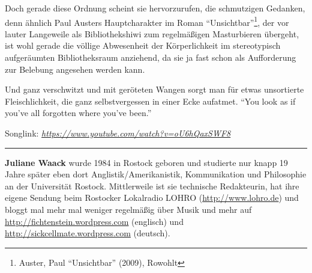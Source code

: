 \documentclass[a4paper,
fontsize=11pt,
oneside,
numbers=noperiodatend,
parskip=half-,
bibliography=totoc,
final
]{scrartcl}
\begin{document}
Doch gerade diese Ordnung scheint sie hervorzurufen, die schmutzigen
Gedanken, denn ähnlich Paul Austers Hauptcharakter im Roman
\enquote{Unsichtbar}\footnote{Auster, Paul \enquote{Unsichtbar} (2009),
  Rowohlt}, der vor lauter Langeweile als Bibliothekshiwi zum
regelmäßigen Masturbieren übergeht, ist wohl gerade die völlige
Abwesenheit der Körperlichkeit im stereotypisch aufgeräumten
Bibliotheksraum anziehend, da sie ja fast schon als Aufforderung zur
Belebung angesehen werden kann.

Und ganz verschwitzt und mit geröteten Wangen sorgt man für etwas
unsortierte Fleischlichkeit, die ganz selbstvergessen in einer Ecke
aufatmet. \enquote{You look as if you've all forgotten where you've
been.}

Songlink:
\href{https://www.youtube.com/watch?v=oU6hQaxSWF8}{\emph{https://www.youtube.com/watch?v=oU6hQaxSWF8}}

\begin{center}\rule{0.5\linewidth}{\linethickness}\end{center}

\textbf{Juliane Waack} wurde 1984 in Rostock geboren und studierte nur
knapp 19 Jahre später eben dort Anglistik/Amerikanistik, Kommunikation
und Philosophie an der Universität Rostock. Mittlerweile ist sie
technische Redakteurin, hat ihre eigene Sendung beim Rostocker
Lokalradio LOHRO (\url{http://www.lohro.de}) und bloggt mal mehr mal
weniger regelmäßig über Musik und mehr auf
\url{http://fichtenstein.wordpress.com} (englisch) und
\url{http://sickcellmate.wordpress.com} (deutsch).
\end{document}
